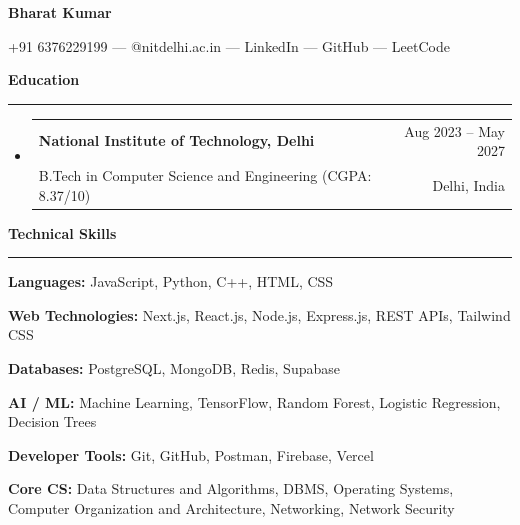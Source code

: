 \documentclass[11pt]{article}
\begin{document}
\fontsize{11}{13}\selectfont
\begin{center}
{\fontsize{24}{26}\selectfont\bfseries Bharat Kumar\par}
\vspace{6pt}
{\normalsize +91 6376229199 \enspace --- @nitdelhi.ac.in \enspace --- \enspace LinkedIn \enspace --- \enspace GitHub \enspace --- \enspace LeetCode\par}
\end{center}

\vspace{8pt}
{\fontsize{15}{17}\selectfont\bfseries Education\par}
\vspace{2pt}
{\color{rulegray}\rule{\textwidth}{0.5pt}}
\vspace{6pt}
\begin{itemize}[leftmargin=16pt,itemsep=0pt,topsep=0pt]
\item \begin{tabularx}{\textwidth}{@{}Xr@{}}
\textbf{National Institute of Technology, Delhi} & Aug 2023 -- May 2027 \\
B.Tech in Computer Science and Engineering (CGPA: 8.37/10) & Delhi, India
\end{tabularx}
\end{itemize}

\vspace{8pt}
{\fontsize{15}{17}\selectfont\bfseries Technical Skills\par}
\vspace{2pt}
{\color{rulegray}\rule{\textwidth}{0.5pt}}
\vspace{4pt}
\textbf{Languages:} JavaScript, Python, C++, HTML, CSS\par
\textbf{Web Technologies:} Next.js, React.js, Node.js, Express.js, REST APIs, Tailwind CSS\par
\textbf{Databases:} PostgreSQL, MongoDB, Redis, Supabase\par
\textbf{AI / ML:} Machine Learning, TensorFlow, Random Forest, Logistic Regression, Decision Trees\par
\textbf{Developer Tools:} Git, GitHub, Postman, Firebase, Vercel\par
\textbf{Core CS:} Data Structures and Algorithms, DBMS, Operating Systems, Computer Organization and Architecture, Networking, Network Security
\end{document}
